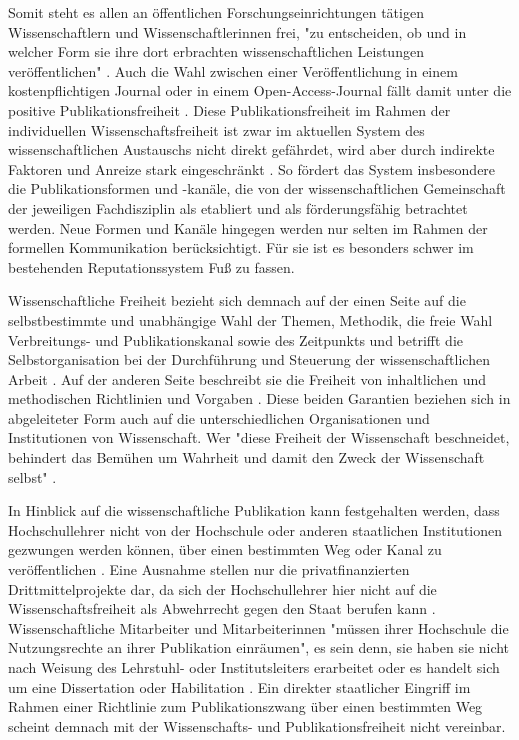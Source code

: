 Somit steht es allen an öffentlichen Forschungseinrichtungen tätigen Wissenschaftlern und Wissenschaftlerinnen frei, "zu entscheiden, ob und in welcher Form sie ihre dort erbrachten wissenschaftlichen Leistungen veröffentlichen" \cite{Schmidt_2009}. Auch die Wahl zwischen einer Veröffentlichung in einem kostenpflichtigen Journal oder in einem Open-Access-Journal fällt damit unter die positive Publikationsfreiheit \cite[:190]{Fehling_2014}. Diese Publikationsfreiheit
im Rahmen der individuellen Wissenschaftsfreiheit ist zwar im aktuellen System des wissenschaftlichen Austauschs nicht direkt gefährdet, wird aber durch indirekte Faktoren und Anreize stark eingeschränkt \cite{Binswanger_2014}. So fördert das System insbesondere die Publikationsformen und -kanäle, die von der wissenschaftlichen Gemeinschaft der jeweiligen Fachdisziplin als etabliert und als förderungsfähig betrachtet werden. Neue Formen und Kanäle hingegen werden nur selten im Rahmen der formellen Kommunikation berücksichtigt. Für sie ist es besonders schwer im bestehenden Reputationssystem Fuß zu fassen.

Wissenschaftliche Freiheit bezieht sich demnach auf der einen Seite auf die selbstbestimmte und unabhängige Wahl der Themen, Methodik, die freie Wahl Verbreitungs- und Publikationskanal sowie des Zeitpunkts und betrifft die Selbstorganisation bei der Durchführung und Steuerung der wissenschaftlichen Arbeit \cite{Fehling_2014}. Auf der anderen Seite beschreibt sie die Freiheit von inhaltlichen und methodischen Richtlinien und Vorgaben \cite{Goetting_2015}. Diese beiden Garantien beziehen sich in abgeleiteter Form auch auf die unterschiedlichen Organisationen und Institutionen von Wissenschaft. Wer "diese Freiheit der Wissenschaft beschneidet, behindert das Bemühen um Wahrheit und damit den Zweck der Wissenschaft selbst" \cite{Oezmen_2015}.

In Hinblick auf die wissenschaftliche Publikation kann festgehalten werden, dass Hochschullehrer nicht von der Hochschule oder anderen staatlichen Institutionen gezwungen werden können, über einen bestimmten Weg oder Kanal zu veröffentlichen \cite{Spindler_2006} \cite{Dorschel_2006}. Eine Ausnahme stellen nur die privatfinanzierten Drittmittelprojekte dar, da sich der Hochschullehrer hier nicht auf die Wissenschaftsfreiheit als Abwehrrecht gegen den Staat berufen kann \cite{Spindler_2006}. Wissenschaftliche Mitarbeiter und Mitarbeiterinnen "müssen ihrer Hochschule die Nutzungsrechte an ihrer Publikation einräumen", es sein denn, sie haben sie nicht nach Weisung des Lehrstuhl- oder Institutsleiters erarbeitet oder es handelt sich um eine Dissertation oder Habilitation \cite{Spindler_2006}. Ein direkter staatlicher Eingriff im Rahmen einer Richtlinie zum Publikationszwang über einen bestimmten Weg scheint demnach mit der Wissenschafts- und Publikationsfreiheit nicht vereinbar.

